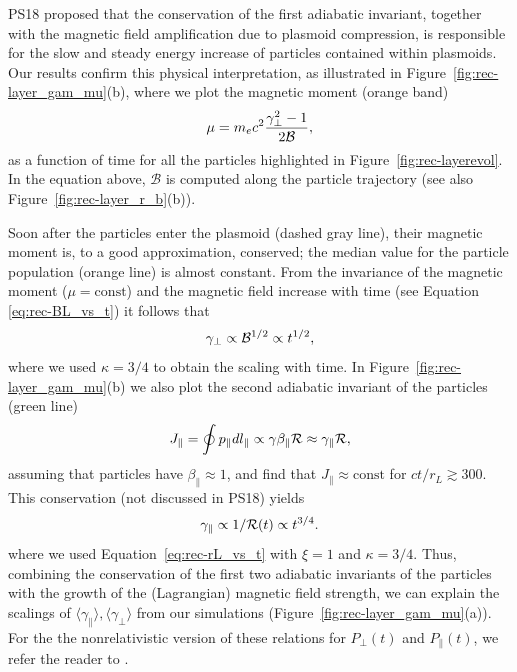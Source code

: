 PS18 proposed that the conservation of the first adiabatic invariant, together with the magnetic field amplification due to plasmoid compression, is responsible for the slow and steady energy increase of particles contained within plasmoids. Our results confirm this physical interpretation, as illustrated in  Figure~\ref{fig:rec-layer_gam_mu}(b),
where we plot the magnetic moment (orange band)
\begin{equation}
\label{eq:rec-mu}
    \mu=m_e c^2\frac{\gamma_\perp^2-1}{2 \mathcal{B}},
\end{equation} 
as a function of time for all the particles highlighted in Figure~\ref{fig:rec-layerevol}. In the equation above, $\mathcal{B}$ is computed along the particle trajectory (see also Figure~\ref{fig:rec-layer_r_b}(b)).

Soon after the particles enter the plasmoid (dashed gray line), their magnetic moment is, to a good approximation, conserved; the median value for the particle population (orange line) is almost constant. From the invariance of the magnetic moment ($\mu = \mathrm{const}$) and the magnetic field increase with time (see Equation \eqref{eq:rec-BL_vs_t}) it follows that
\begin{equation}
    \gamma_{\perp}\propto \mathcal{B}^{1/2}\propto t^{1/2},
\end{equation}
where we used $\kappa=3/4$ to obtain the scaling with time. In Figure~\ref{fig:rec-layer_gam_mu}(b) we also plot the second adiabatic invariant of the particles (green line)
\begin{equation}
\label{eq:rec-Jpar}
    J_{\parallel}=\oint p_{\parallel}dl_{\parallel} \propto \gamma\beta_{\parallel}\mathcal{R}\approx
    \gamma_{\parallel}\mathcal{R},
\end{equation}
assuming that particles have $\beta_\parallel\approx 1$, and find that $J_{\parallel}\approx \mathrm{const}$ for $ct/r_L \gtrsim 300$. This conservation (not discussed in PS18) yields
\begin{equation}
    \gamma_{\parallel}\propto 1/\mathcal{R}(t)\propto t^{3/4}.
\end{equation}
where we used Equation~\eqref{eq:rec-rL_vs_t} with $\xi=1$ and $\kappa=3/4$. Thus, combining the conservation of the first two adiabatic invariants of the particles with the growth of the (Lagrangian) magnetic field strength, we can explain the scalings of $\langle \gamma_{\parallel}\rangle, \langle\gamma_{\perp}\rangle$ from our simulations (Figure~\ref{fig:rec-layer_gam_mu}(a)). For the the nonrelativistic version of these relations for $P_\perp(t)$ and $P_\parallel(t)$, we refer the reader to  \cite{2017PhPl...24f2906M}.

